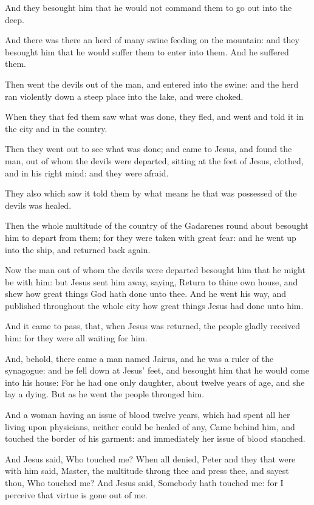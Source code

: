 \verse And they besought him that he would not command them to go out into the deep.

\verse And there was there an herd of many swine feeding on the mountain: and they besought him that he would suffer them to enter into them. And he suffered them.

\verse Then went the devils out of the man, and entered into the swine: and the herd ran violently down a steep place into the lake, and were choked.

\verse When they that fed them saw what was done, they fled, and went and told it in the city and in the country.

\verse Then they went out to see what was done; and came to Jesus, and found the man, out of whom the devils were departed, sitting at the feet of Jesus, clothed, and in his right mind: and they were afraid.

\verse They also which saw it told them by what means he that was possessed of the devils was healed.

\verse Then the whole multitude of the country of the Gadarenes round about besought him to depart from them; for they were taken with great fear: and he went up into the ship, and returned back again.

\verse Now the man out of whom the devils were departed besought him that he might be with him: but Jesus sent him away, saying, \verse Return to thine own house, and shew how great things God hath done unto thee. And he went his way, and published throughout the whole city how great things Jesus had done unto him.

\verse And it came to pass, that, when Jesus was returned, the people gladly received him: for they were all waiting for him.

\verse And, behold, there came a man named Jairus, and he was a ruler of the synagogue: and he fell down at Jesus' feet, and besought him that he would come into his house: \verse For he had one only daughter, about twelve years of age, and she lay a dying. But as he went the people thronged him.

\verse And a woman having an issue of blood twelve years, which had spent all her living upon physicians, neither could be healed of any, \verse Came behind him, and touched the border of his garment: and immediately her issue of blood stanched.

\verse And Jesus said, Who touched me? When all denied, Peter and they that were with him said, Master, the multitude throng thee and press thee, and sayest thou, Who touched me?  \verse And Jesus said, Somebody hath touched me: for I perceive that virtue is gone out of me.

